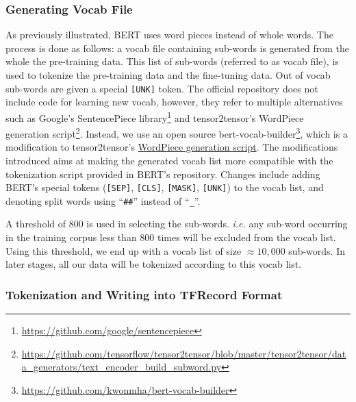 \subsubsection{Generating Vocab File}
As previously illustrated, \ac{BERT} uses word pieces instead of whole words. The process is done as follows: a vocab file containing sub-words is generated from the whole the pre-training data. This list of sub-words (referred to as vocab file), is used to tokenize the pre-training data and the fine-tuning data. Out of vocab sub-words are given a special \texttt{[UNK]} token. The official repository does not include code for learning new vocab, however, they refer to multiple alternatives such as Google's SentencePiece library\footnote{\url{https://github.com/google/sentencepiece}} and tensor2tensor's WordPiece generation script\footnote{\url{https://github.com/tensorflow/tensor2tensor/blob/master/tensor2tensor/data_generators/text_encoder_build_subword.py}}. Instead, we use an open source bert-vocab-builder\footnote{\url{https://github.com/kwonmha/bert-vocab-builder}}, which is a modification to tensor2tensor's \href{https://github.com/tensorflow/tensor2tensor/blob/master/tensor2tensor/data_generators/text_encoder_build_subword.py}{WordPiece generation script}. The modifications introduced aims at making the generated vocab list more compatible with the tokenization script provided in \ac{BERT}'s repository. Changes include adding \ac{BERT}'s special tokens (\texttt{[SEP]}, \texttt{[CLS]}, \texttt{[MASK]}, \texttt{[UNK]}) to the vocab list, and denoting split words using \enquote{\texttt{\#\#}} instead of \enquote{\texttt{\_}}. 

A threshold of 800 is used in selecting the sub-words. \textit{i.e.} any sub-word occurring in the training corpus less than 800 times will be excluded from the vocab list. Using this threshold, we end up with a vocab list of size	$\approx 10,000$ sub-words. In later stages, all our data will be tokenized according to this vocab list.


\subsubsection{Tokenization and Writing into TFRecord Format}

